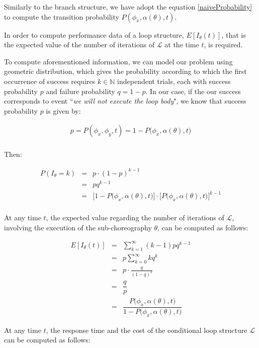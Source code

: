 \documentclass[12pt,a4paper]{report}
\newcommand{\N}{\mathbb{N}}
\begin{document}
Similarly to the branch structure, we have adopt the equation \ref{naiveProbability} to compute the transition probability $P(\phi_{x}, \alpha(\theta), t)$.

In order to compute performance data of a loop structure, $E[I_{\theta}(t)]$, that is the expected value of the number of iterations of $\mathcal{L}$ at the time $t$, is required.

To compute aforementioned information, we can model our problem using geometric distribution, which gives the probability according to which the first occurrence of success requires $k \in \N$ independent trials, each with success probability $p$ and failure probability $q = 1 - p$. In our case, if the our success corresponds to event ``\textit{we will not execute the loop body}", we know that success probability $p$ is given by:

\begin{eqnarray}
	p = P(\phi_x,\phi_y,t) = 1 - P\Big(\phi_{x}, \alpha(\theta),t\Big) \\
\end{eqnarray}

Then:

\begin{eqnarray}
	P(I_{\theta} = k) & = & p \cdot (1-p)^{k-1} \\
	& = & pq^{k-1} \\
	& = & \Big[  1 - P\Big(\phi_{x}, \alpha(\theta),t\Big) \Big] \cdot \bigg[  P\Big(\phi_{x}, \alpha(\theta),t\Big) \bigg] ^{k-1} \\
\end{eqnarray}

At any time $t$, the expected value regarding the number of iterations of $\mathcal{L}$, involving the execution of the sub-choreography $\theta$, can be computed as follows:

\begin{eqnarray}
	E[I_{\theta}(t)] & = & \sum_{k = 1}^\infty (k-1) pq^{k-1} \nonumber \\
	& = & p \sum_{k = 0}^\infty kq^{k} \nonumber \\
	& = & p \cdot \frac{q}{(1-q)^2} \nonumber \\
	& = & \dfrac{q}{p} \nonumber \\
	& = & \dfrac{P\Big(\phi_{x}, \alpha(\theta),t\Big)}{1 - P\Big(\phi_{x}, \alpha(\theta),t\Big)} 
\end{eqnarray}

At any time $t$, the response time and the cost of the conditional loop structure $\mathcal{L}$ can be computed as follows:
\end{document}
